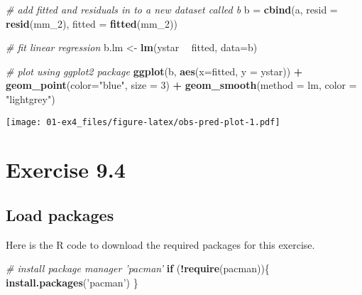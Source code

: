 \documentclass[]{book}
\newenvironment{Shaded}{\begin{snugshade}}{\end{snugshade}}
\newcommand{\CommentTok}[1]{\textcolor[rgb]{0.56,0.35,0.01}{\textit{#1}}}
\newcommand{\ControlFlowTok}[1]{\textcolor[rgb]{0.13,0.29,0.53}{\textbf{#1}}}
\newcommand{\DataTypeTok}[1]{\textcolor[rgb]{0.13,0.29,0.53}{#1}}
\newcommand{\DecValTok}[1]{\textcolor[rgb]{0.00,0.00,0.81}{#1}}
\newcommand{\KeywordTok}[1]{\textcolor[rgb]{0.13,0.29,0.53}{\textbf{#1}}}
\newcommand{\NormalTok}[1]{#1}
\newcommand{\OperatorTok}[1]{\textcolor[rgb]{0.81,0.36,0.00}{\textbf{#1}}}
\newcommand{\StringTok}[1]{\textcolor[rgb]{0.31,0.60,0.02}{#1}}
\begin{document}
\begin{Shaded}
\begin{Highlighting}[]
\CommentTok{# add fitted and residuals in to a new dataset called b}
\NormalTok{b =}\StringTok{ }\KeywordTok{cbind}\NormalTok{(a, }\DataTypeTok{resid =} \KeywordTok{resid}\NormalTok{(mm_}\DecValTok{2}\NormalTok{), }\DataTypeTok{fitted =} \KeywordTok{fitted}\NormalTok{(mm_}\DecValTok{2}\NormalTok{))}

\CommentTok{# fit linear regression}
\NormalTok{b.lm <-}\StringTok{ }\KeywordTok{lm}\NormalTok{(ystar }\OperatorTok{~}\StringTok{ }\NormalTok{fitted, }\DataTypeTok{data=}\NormalTok{b)}

\CommentTok{# plot using ggplot2 package}
\KeywordTok{ggplot}\NormalTok{(b, }\KeywordTok{aes}\NormalTok{(}\DataTypeTok{x=}\NormalTok{fitted, }\DataTypeTok{y =}\NormalTok{ ystar)) }\OperatorTok{+}
\StringTok{  }\KeywordTok{geom_point}\NormalTok{(}\DataTypeTok{color=}\StringTok{"blue"}\NormalTok{, }\DataTypeTok{size =} \DecValTok{3}\NormalTok{) }\OperatorTok{+}
\StringTok{  }\KeywordTok{geom_smooth}\NormalTok{(}\DataTypeTok{method =}\NormalTok{ lm, }\DataTypeTok{color =} \StringTok{"lightgrey"}\NormalTok{)}
\end{Highlighting}
\end{Shaded}

\texttt{[image: 01-ex4\_files/figure-latex/obs-pred-plot-1.pdf]}

\hypertarget{ex9_4}{%
\chapter{Exercise 9.4}\label{ex9_4}}

\hypertarget{load-packages-1}{%
\section{Load packages}\label{load-packages-1}}

Here is the R code to download the required packages for this exercise.

\begin{Shaded}
\begin{Highlighting}[]
\CommentTok{# install package manager 'pacman'}
\ControlFlowTok{if}\NormalTok{ (}\OperatorTok{!}\KeywordTok{require}\NormalTok{(pacman))\{}
  \KeywordTok{install.packages}\NormalTok{(}\StringTok{'pacman'}\NormalTok{)}
\NormalTok{\}}
\end{Highlighting}
\end{Shaded}
\end{document}
